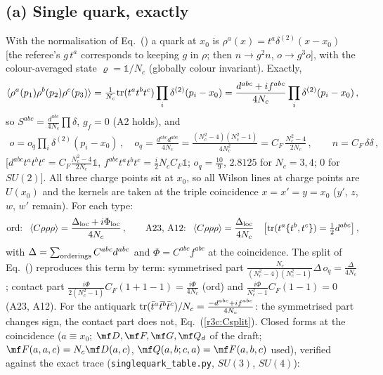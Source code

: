 \subsection{(a) Single quark, exactly}\label{r3c:quark}
With the normalisation of Eq.~() a quark at $x_0$ is $\rho^a(x)=t^a\delta^{(2)}(x-x_0)$ [the referee's $g\,t^a$ corresponds to keeping $g$ in $\rho$; then $n\to g^2n$, $o\to g^3o$], with the colour-averaged state $\varrho=\mathbb 1/N_c$ (globally colour invariant). Exactly,
\begin{align}\label{r3c:q3}
\langle\rho^a(p_1)\rho^b(p_2)\rho^c(p_3)\rangle=\tfrac1{N_c}{\rm tr}(t^at^bt^c)\prod_i\delta^{(2)}(p_i-x_0)=\frac{d^{abc}+if^{abc}}{4N_c}\prod_i\delta^{(2)}(p_i-x_0)\,,
\end{align}
so $S^{abc}=\frac{d^{abc}}{4N_c}\prod\delta$, $g_f=0$ (A2 holds), and
\begin{align}\label{r3c:oq}
o=o_q\prod_i\delta^{(2)}(p_i-x_0)\,,\quad o_q=\frac{d^{abc}d^{abc}}{4N_c}=\frac{(N_c^2-4)(N_c^2-1)}{4N_c^2}=C_F\,\frac{N_c^2-4}{2N_c}\,,\qquad n=C_F\,\delta\delta\,,
\end{align}
[$d^{abc}t^at^bt^c=C_F\frac{N_c^2-4}{2N_c}\mathbb 1$, $f^{abc}t^at^bt^c=\frac{i}{2}N_cC_F\mathbb 1$; $o_q=\frac{10}{9}$, $2.8125$ for $N_c=3,4$; $0$ for $SU(2)$]. All three charge points sit at $x_0$, so all Wilson lines at charge points are $U(x_0)$ and the kernels are taken at the triple coincidence $x=x'=y=x_0$ ($y'$, $z$, $w$, $w'$ remain). For each type:
\begin{align}\label{r3c:qtypes}
\text{ord: }\ \langle C\rho\rho\rho\rangle=\frac{\Delta_{\rm loc}+i\Phi_{\rm loc}}{4N_c}\,,\qquad
\text{A23, A12: }\ \langle C\rho\rho\rho\rangle=\frac{\Delta_{\rm loc}}{4N_c}\quad\big[{\rm tr}(t^a\{t^b,t^c\})=\tfrac12d^{abc}\big]\,,
\end{align}
with $\Delta=\sum_{\rm orderings}C^{abc}d^{abc}$ and $\Phi=C^{abc}f^{abc}$ at the coincidence. The split of Eq.~() reproduces this term by term: symmetrised part $\frac{N_c}{(N_c^2-4)(N_c^2-1)}\Delta\,o_q=\frac{\Delta}{4N_c}$; contact part $\frac{i\Phi}{2(N_c^2-1)}C_F(1+1-1)=\frac{i\Phi}{4N_c}$ (ord) and $\frac{i\Phi}{N_c^2-1}C_F(1-1)=0$ (A23, A12). For the antiquark ${\rm tr}(\bar t^a\bar t^b\bar t^c)/N_c=\frac{-d^{abc}+if^{abc}}{4N_c}$: the symmetrised part changes sign, the contact part does not, Eq.~(\ref{r3c:Csplit}). Closed forms at the coincidence ($a\equiv x_0$; $\mf D,\mf F,\mf G,\mf Q_d$ of the draft; $\mf F(a,a,c)=N_c\mf D(a,c)$, $\mf Q(a,b;c,a)=\mf F(a,b,c)$ used), verified against the exact trace (\texttt{singlequark\_table.py}, $SU(3)$, $SU(4)$):
